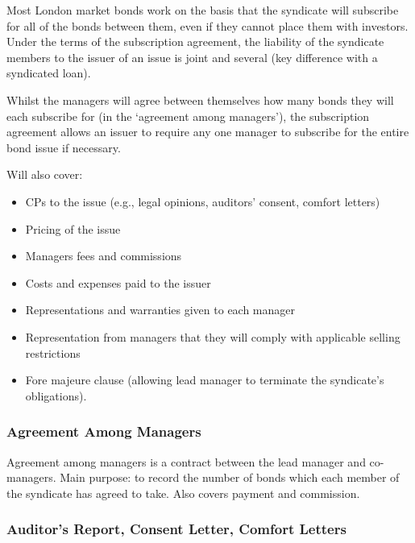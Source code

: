 \documentclass[
]{article}
\providecommand{\tightlist}{%
  \setlength{\itemsep}{0pt}\setlength{\parskip}{0pt}}
\begin{document}
Most London market bonds work on the basis that the syndicate will
subscribe for all of the bonds between them, even if they cannot place
them with investors. Under the terms of the subscription agreement, the
liability of the syndicate members to the issuer of an issue is joint
and several (key difference with a syndicated loan).

Whilst the managers will agree between themselves how many bonds they
will each subscribe for (in the `agreement among managers'), the
subscription agreement allows an issuer to require any one manager to
subscribe for the entire bond issue if necessary.

Will also cover:

\begin{itemize}
\tightlist
\item
  CPs to the issue (e.g., legal opinions, auditors' consent, comfort
  letters)
\item
  Pricing of the issue
\item
  Managers fees and commissions
\item
  Costs and expenses paid to the issuer
\item
  Representations and warranties given to each manager
\item
  Representation from managers that they will comply with applicable
  selling restrictions
\item
  Fore majeure clause (allowing lead manager to terminate the
  syndicate's obligations).
\end{itemize}

\hypertarget{agreement-among-managers}{%
\subsubsection{Agreement Among
Managers}\label{agreement-among-managers}}

Agreement among managers is a contract between the lead manager and
co-managers. Main purpose: to record the number of bonds which each
member of the syndicate has agreed to take. Also covers payment and
commission.

\hypertarget{auditors-report-consent-letter-comfort-letters}{%
\subsubsection{Auditor's Report, Consent Letter, Comfort
Letters}\label{auditors-report-consent-letter-comfort-letters}}
\end{document}
